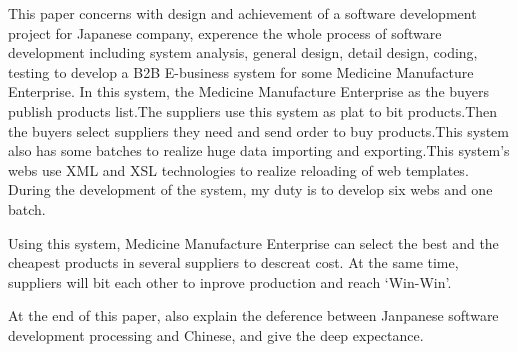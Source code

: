 \documentclass[printMode=true, declarePage=false]{ecnuthesis}
\begin{document}
\tableofcontents

\frontmatter

\begin{abstract}
  本文通过一个实际的对日软件外包案件的设计和实现，经历了整个软件开发的过程，包括系统分析、概要设计、详细设计、编码、测试，为某制药企业开发了一个 B2B 的电子商务系统。本系统主要是以该制药企业为购买方，发布企业所需要的货物清单，以本系统为平台，各个供应商进行竞标，由购买方选择购买供应商的货物并下订单发货。由于购买方发布货物需要对大量数据进行操作，因此制作了数据批处理程序，来实现大量数据的导入和导出。系统的在线部分运用了XML和XSL技术，体现了画面实现模版化的优势，使得更有效方便的实现画面重载。该系统的开发过程中，本人主要负责制造在线部分的登陆、Home、估价请求履历检索、取消订单一览、用户信息作成、通知信息作成6个模块以及数据批处理部分的供应商 Master 导入程序。

  使用该系统，制药企业可以在众多供应商中选择最价廉物美的原材料，这样大大降低其成本，提高了企业利润。同时，供应商之间也有了相互竞争，可以促进生产，达到“双赢”的效果。
  本文最后说明了对日软件开发过程与当今我国软件开发过程的区别，并对我国今后软件事业做了期望和展望。
\end{abstract}

\begin{abstractEN}
  This paper concerns with design and achievement of a software development project for Japanese company, experence the whole process of software development including system analysis, general design, detail design, coding, testing to develop a B2B E-business system for some Medicine Manufacture Enterprise. In this system, the Medicine Manufacture Enterprise as the buyers publish products list.The suppliers use this system as plat to bit products.Then the buyers select suppliers they need and send order to buy products.This system also has some batches to realize huge data importing and exporting.This system's webs use XML and XSL technologies to realize reloading of web templates. During the development of the system, my duty is to develop six webs and one batch.

  Using this system, Medicine Manufacture Enterprise can select the best and the cheapest products in several suppliers to descreat cost. At the same time, suppliers will bit each other to inprove production and reach ‘Win-Win’.
  
  At the end of this paper, also explain the deference between Janpanese software development processing and Chinese, and give the deep expectance.
\end{abstractEN}
\end{document}
